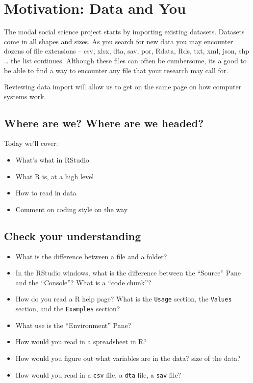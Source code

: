 \documentclass[]{book}
\providecommand{\tightlist}{%
  \setlength{\itemsep}{0pt}\setlength{\parskip}{0pt}}
\theoremstyle{definition}
\theoremstyle{definition}
\theoremstyle{definition}
\theoremstyle{remark}
\begin{document}
\hypertarget{motivation-data-and-you}{%
\section*{Motivation: Data and You}\label{motivation-data-and-you}}

The modal social science project starts by importing existing datasets. Datasets come in all shapes and sizes. As you search for new data you may encounter dozens of file extensions -- csv, xlsx, dta, sav, por, Rdata, Rds, txt, xml, json, shp \ldots{} the list continues. Although these files can often be cumbersome, its a good to be able to find a way to encounter any file that your research may call for.

Reviewing data import will allow us to get on the same page on how computer systems work.

\hypertarget{where-are-we-where-are-we-headed}{%
\subsection*{Where are we? Where are we headed?}\label{where-are-we-where-are-we-headed}}

Today we'll cover:

\begin{itemize}
\tightlist
\item
  What's what in RStudio
\item
  What R is, at a high level
\item
  How to read in data
\item
  Comment on coding style on the way
\end{itemize}

\hypertarget{check-your-understanding}{%
\subsection*{Check your understanding}\label{check-your-understanding}}

\begin{itemize}
\tightlist
\item
  What is the difference between a file and a folder?
\item
  In the RStudio windows, what is the difference between the ``Source'' Pane and the ``Console''? What is a ``code chunk''?
\item
  How do you read a R help page? What is the \texttt{Usage} section, the \texttt{Values} section, and the \texttt{Examples} section?
\item
  What use is the ``Environment'' Pane?
\item
  How would you read in a spreadsheet in R?
\item
  How would you figure out what variables are in the data? size of the data?
\item
  How would you read in a \texttt{csv} file, a \texttt{dta} file, a \texttt{sav} file?
\end{itemize}
\end{document}
